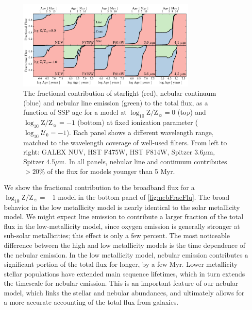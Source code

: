 \documentclass[trackchanges, twocolumn, tighten]{aastex61}
\newcommand{\Fig}[1]{\autoref{fig:#1}}
\newcommand{\logten}{\ensuremath{\log_{10}}}
\newcommand{\logZeq}[1]{\ensuremath{\logten \mathrm{Z}/\mathrm{Z}_{\sun} = #1}}
\newcommand{\logU}{\ensuremath{\logten \mathcal{U}_0}}
\begin{document}
\begin{figure}
  \begin{centering}
    \includegraphics[width=0.8\textwidth]{f12.pdf}
    \caption{The fractional contribution of starlight (red), nebular continuum (blue) and nebular line emission (green) to the total flux, as a function of SSP age for a model at \logZeq{0} (top) and \logZeq{-1} (bottom) at fixed ionization parameter ($\logU=-1$). Each panel shows a different wavelength range, matched to the wavelength coverage of well-used filters. From left to right: GALEX NUV, HST F475W, HST F814W, Spitzer 3.6$\mu$m, Spitzer 4.5$\mu$m. In all panels, nebular line and continuum contributes $>20\%$ of the flux for models younger than 5 Myr.}
    \label{fig:nebFracFlu}
  \end{centering}
\end{figure}

We show the fractional contribution to the broadband flux for a \logZeq{-1} model in the bottom panel of \Fig{nebFracFlu}. The broad behavior in the low metallicity model is nearly identical to the solar metallicity model. We might expect line emission to contribute a larger fraction of the total flux in the low-metallicity model, since oxygen emission is generally stronger at sub-solar metallicities; this effect is only a few percent. The most noticeable difference between the high and low metallicity models is the time dependence of the nebular emission. In the low metallicity model, nebular emission contributes a significant portion of the total flux for longer, by a few Myr. Lower metallicity stellar populations have extended main sequence lifetimes, which in turn extends the timescale for nebular emission. This is an important feature of our nebular model, which links the stellar and nebular abundances, and ultimately allows for a more accurate accounting of the total flux from galaxies.
\end{document}
